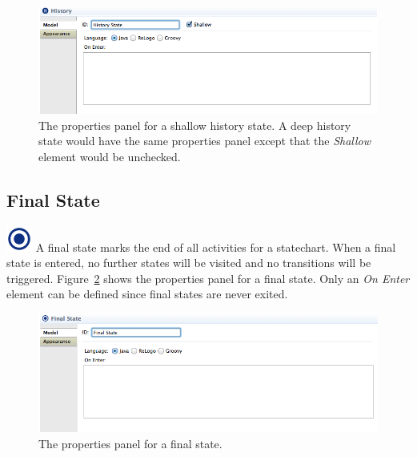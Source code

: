 \documentclass[11pt]{amsart}
\begin{document}
\begin{figure}
\begin{center}
\vspace{.2in}
\centerline {
\includegraphics[width=5in]{StatechartsImages/HistoryProperties.png}
}
\caption{The properties panel for a shallow history state. A deep history state would have the same properties panel except that the \emph{Shallow} element would be unchecked.}
\label{fig:historyProperties}
\end{center}
\end{figure}

\clearpage

\subsection{Final State}
\label{sec:finalState}
\includegraphics[height=.2in]{StatechartsImages/Final-State-32.png}
A final state marks the end of all activities for a statechart. When a final state is entered, no further states will be visited and no transitions will be triggered. Figure~\ref{fig:finalProperties} shows the properties panel for a final state. Only an \emph{On Enter} element can be defined since final states are never exited.

\begin{figure}
\begin{center}
\vspace{.2in}
\centerline {
\includegraphics[width=5in]{StatechartsImages/FinalProperties.png}
}
\caption{The properties panel for a final state.}
\label{fig:finalProperties}
\end{center}
\end{figure}
\end{document}
